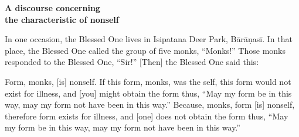 
\bigskip
\begin{center}
\textbf{A discourse concerning\\the characteristic of nonself}
\end{center}

\setcounter{sennum}{0}
 In one occasion, the Blessed One lives in Isipatana Deer Park, B\=ar\=a\d nas\=i.  In that place, the Blessed One called the group of five monks, ``Monks!''  Those monks responded to the Blessed One, ``Sir!'' [Then] the Blessed One said this:

 Form, monks, [is] nonself.  If this form, monks, was the self, this form would not exist for illness, and [you] might obtain the form thus, ``May my form be in this way, may my form not have been in this way.''  Because, monks, form [is] nonself, therefore form exists for illness, and [one] does not obtain the form thus, ``May my form be in this way, may my form not have been in this way.''

